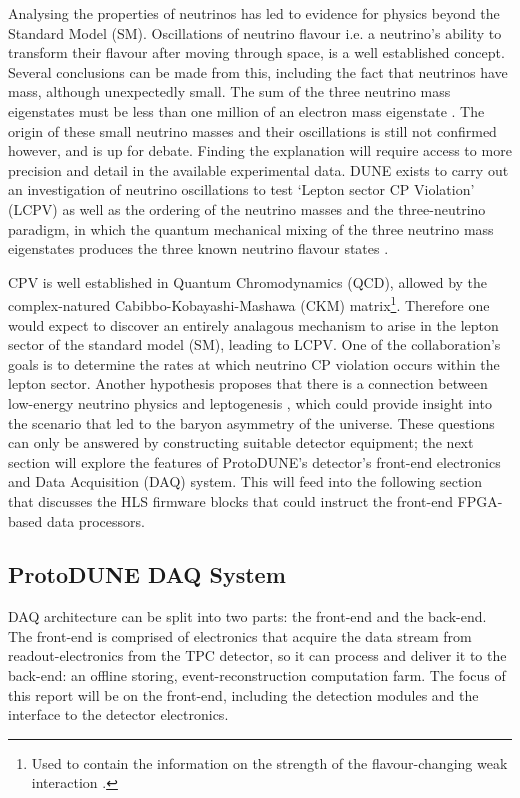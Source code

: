 \documentclass[10pt]{article}
\begin{document}
Analysing the properties of neutrinos has led to evidence for physics beyond the Standard Model (SM). Oscillations of neutrino flavour i.e. a neutrino's ability to transform their flavour after moving through space, is a well established concept. Several conclusions can be made from this, including the fact that neutrinos have mass, although unexpectedly small. The sum of the three neutrino mass eigenstates must be less than one million of an electron mass eigenstate \cite{Mertens_2016, cooper2016masses}. The origin of these small neutrino masses and their oscillations is still not confirmed however, and is up for debate. Finding the explanation will require access to more precision and detail in the available experimental data. DUNE exists to carry out an investigation of neutrino oscillations to test `Lepton sector CP Violation' (LCPV) as well as the ordering of the neutrino masses and the three-neutrino paradigm, in which the quantum mechanical mixing of the three neutrino mass eigenstates produces the three known neutrino flavour states \cite{acciarri2016longbaseline}.

CPV is well established in Quantum Chromodynamics (QCD), allowed by the complex-natured Cabibbo-Kobayashi-Mashawa (CKM) matrix\footnote{Used to contain the information on the strength of the flavour-changing weak interaction \cite{kobayashi1973cp}.}\cite{kobayashi1973cp}. Therefore one would expect to discover an entirely analagous mechanism to arise in the lepton sector of the standard model (SM), leading to LCPV. One of the collaboration's goals is to determine the rates at which neutrino CP violation occurs within the lepton sector. Another hypothesis proposes that there is a connection between low-energy neutrino physics and leptogenesis \cite{Di_Bari_2012}, which could provide insight into the scenario that led to the baryon asymmetry of the universe. These questions can only be answered by constructing suitable detector equipment; the next section will explore the features of ProtoDUNE's detector's front-end electronics and Data Acquisition (DAQ) system. This will feed into the following section that discusses the HLS firmware blocks that could instruct the front-end FPGA-based data processors.

\subsection{ProtoDUNE DAQ System}\label{section:overview}

DAQ architecture can be split into two parts: the front-end and the back-end. The front-end is comprised of electronics that acquire the data stream from readout-electronics from the TPC detector, so it can process and deliver it to the back-end: an offline storing, event-reconstruction computation farm. The focus of this report will be on the front-end, including the detection modules and the interface to the detector electronics.
\end{document}
